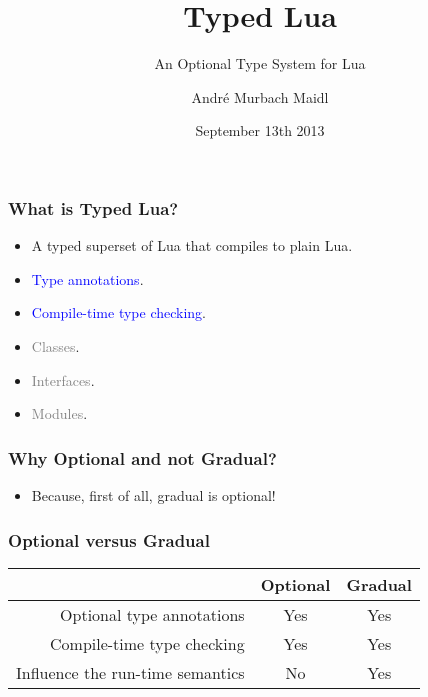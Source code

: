 \documentclass{beamer}
\begin{document}
\title{Typed Lua}
\subtitle{An Optional Type System for Lua}
\author{André Murbach Maidl}
\date{September 13th 2013}

\frame{\titlepage}

\begin{frame}
\frametitle{What is Typed Lua?}
\begin{itemize}
\item A typed superset of Lua that compiles to plain Lua.
\item \textcolor{blue}{Type annotations}.
\item \textcolor{blue}{Compile-time type checking}.
\item \textcolor{gray}{Classes}.
\item \textcolor{gray}{Interfaces}.
\item \textcolor{gray}{Modules}.
\end{itemize}
\end{frame}

\begin{frame}
\frametitle{Why Optional and not Gradual?}
\begin{itemize}
\item Because, first of all, gradual is optional!
\end{itemize}
\end{frame}

\begin{frame}
\frametitle{Optional versus Gradual}
\begin{center}
\begin{tabular}{|r|c|c|}
\hline
& Optional & Gradual\\
\hline
Optional type annotations & Yes & Yes \\ 
\hline
Compile-time type checking & Yes & Yes \\
\hline
Influence the run-time semantics & No & Yes \\
\hline
\end{tabular}
\end{center}
\end{frame}
\end{document}
